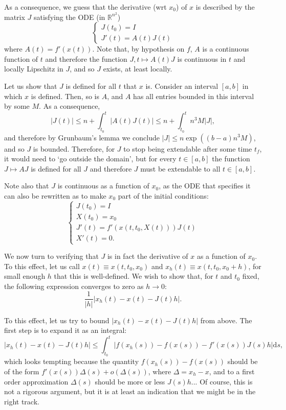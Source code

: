 \documentclass{article}
\newcommand{\R}{\mathbb{R}}
\newcommand{\dd}{\mathrm{d}}
\begin{document}
As a consequence, we guess that the derivative (wrt $x_0$) of $x$ is described by the matrix $J$ satisfying the ODE (in $\R^{n^2}$)
\[
\begin{cases}
J(t_0) = I\\
J'(t) = A(t) J(t)
\end{cases}
\]
where $A(t) = f'(x(t))$. Note that, by hypothesis on $f$, $A$ is a continuous function of $t$ and therefore the function $J, t \mapsto A(t) J$ is continuous in $t$ and locally Lipschitz in $J$, and so $J$ exists, at least locally.

Let us show that $J$ is defined for all $t$ that $x$ is. Consider an interval $[a,b]$ in which $x$ is defined. Then, so is $A$, and $A$ has all entries bounded in this interval by some $M$. As a consequence,
\[\lvert J(t) \rvert \leq n + \int_{t_0}^t \lvert A(t) J(t) \rvert \leq n + \int_{t_0}^t n^3 M \lvert J \rvert,\]
and therefore by Grunbaum's lemma we conclude $\lvert J \rvert \leq n \exp((b-a) n^3 M)$, and so $J$ is bounded. Therefore, for $J$ to stop being extendable after some time $t_f$, it would need to `go outside the domain', but for every $t \in [a,b]$ the function $J \mapsto AJ$ is defined for all $J$ and therefore $J$ must be extendable to all $t \in [a,b]$.

Note also that $J$ is continuous as a function of $x_0$, as the ODE that specifies it can also be rewritten as to make $x_0$ part of the initial conditions:
\[
\begin{cases}
J(t_0) = I\\
X(t_0) = x_0\\
J'(t) = f'(x(t,t_0,X(t))) J(t)\\
X'(t) = 0.
\end{cases}
\]

We now turn to verifying that $J$ is in fact the derivative of $x$ as a function of $x_0$. To this effect, let us call $x(t) \equiv x(t,t_0,x_0)$ and $x_h(t) \equiv x(t,t_0,x_0+h)$, for small enough $h$ that this is well-defined. We wish to show that, for $t$ and $t_0$ fixed, the following expression converges to zero as $h \to 0$:
\[\frac1{\lvert h \rvert} \left\lvert x_h(t) - x(t) - J(t) h \right\rvert.\]

To this effect, let us try to bound $\left\lvert x_h(t) - x(t) - J(t) h \right\rvert$ from above. The first step is to expand it as an integral:
\[\left\lvert x_h(t) - x(t) - J(t) h \right\rvert \leq \int_{t_0}^t \lvert f(x_h(s)) - f(x(s)) - f'(x(s)) J(s) h \rvert \dd s,\]
which looks tempting because the quantity $f(x_h(s)) - f(x(s))$ should be of the form $f'(x(s)) \Delta(s) + o(\Delta(s))$, where $\Delta = x_h - x$, and to a first order approximation $\Delta(s)$ should be more or less $J(s)h$... Of course, this is not a rigorous argument, but it is at least an indication that we might be in the right track.
\end{document}

